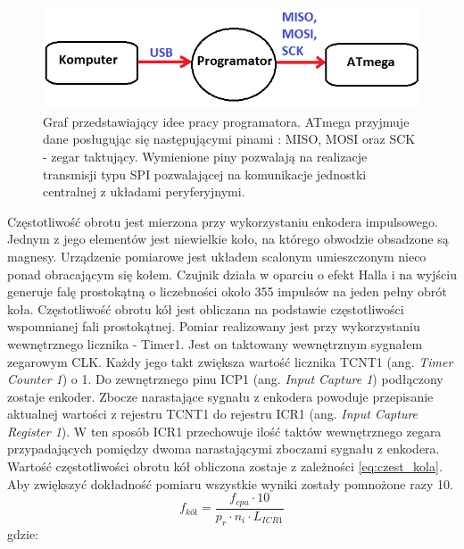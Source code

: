   \begin{figure}[H]
    \begin{center}
      \includegraphics[scale=0.7]{imgs/schemat_prog.png}
 	\caption[Podłączenie programatora.]{\small{Graf przedstawiający idee pracy programatora. ATmega przyjmuje dane posługując się następującymi pinami : MISO, MOSI oraz SCK - zegar taktujący. Wymienione piny pozwalają na realizacje transmisji typu SPI pozwalającej na komunikacje jednostki centralnej z układami peryferyjnymi.}}
	\label{schem_prog}
    \end{center}
  \end{figure}  
  
Częstotliwość obrotu jest mierzona przy wykorzystaniu enkodera impulsowego. Jednym z jego elementów jest niewielkie koło, na którego obwodzie obsadzone są magnesy. Urządzenie pomiarowe jest układem scalonym umieszczonym nieco ponad obracającym się kołem. Czujnik działa w oparciu o efekt Halla i na wyjściu generuje falę prostokątną o liczebności około 355 impulsów na jeden pełny obrót koła. Częstotliwość obrotu kół jest obliczana na podstawie częstotliwości wspomnianej fali prostokątnej. Pomiar realizowany jest przy wykorzystaniu wewnętrznego licznika - Timer1. Jest on taktowany wewnętrznym sygnałem zegarowym CLK. Każdy jego takt zwiększa wartość licznika TCNT1 (ang. \textit{Timer Counter 1}) o 1. Do zewnętrznego pinu ICP1 (ang. \textit{Input Capture 1}) podłączony zostaje enkoder. Zbocze narastające sygnału z enkodera powoduje przepisanie aktualnej wartości z rejestru TCNT1 do rejestru ICR1 (ang. \textit{Input Capture Register 1}). W ten sposób ICR1 przechowuje ilość taktów wewnętrznego zegara przypadających pomiędzy dwoma narastającymi zboczami sygnału z enkodera. Wartość częstotliwości obrotu kół obliczona zostaje z zależności \ref{eq:czest_kola}. Aby zwiększyć dokładność pomiaru wszystkie wyniki zostały pomnożone razy 10.
\begin{equation}
	f_{kół} =  \frac{f_{cpu} \cdot 10}{p_r \cdot n_i \cdot L_{ICR1} } 
   \label{eq:czest_kola}
 \end{equation}
 gdzie:  
 \begin{equationDescriptor}
 \end{equationDescriptor} 

